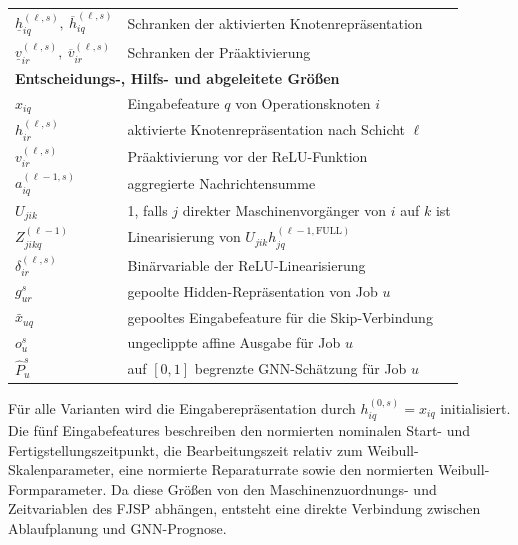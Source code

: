 \begin{table}[H]
\begin{tabularx}{\textwidth}{@{}lX@{}}
$\underline{h}_{iq}^{(\ell,s)},\ \overline{h}_{iq}^{(\ell,s)}$
& Schranken der aktivierten Knotenrepräsentation \\

$\underline{v}_{ir}^{(\ell,s)},\ \overline{v}_{ir}^{(\ell,s)}$
& Schranken der Präaktivierung \\

\midrule
\multicolumn{2}{l}{\textbf{Entscheidungs-, Hilfs- und abgeleitete Größen}}\\
\midrule

$x_{iq}$
& Eingabefeature $q$ von Operationsknoten $i$ \\

$h_{ir}^{(\ell,s)}$
& aktivierte Knotenrepräsentation nach Schicht $\ell$ \\

$v_{ir}^{(\ell,s)}$
& Präaktivierung vor der ReLU-Funktion \\

$a_{iq}^{(\ell-1,s)}$
& aggregierte Nachrichtensumme \\

$U_{jik}$
& 1, falls $j$ direkter Maschinenvorgänger von $i$ auf $k$ ist \\

$Z_{jikq}^{(\ell-1)}$
& Linearisierung von $U_{jik}h_{jq}^{(\ell-1,\mathrm{FULL})}$ \\

$\delta_{ir}^{(\ell,s)}$
& Binärvariable der ReLU-Linearisierung \\

$g_{ur}^{s}$
& gepoolte Hidden-Repräsentation von Job $u$ \\

$\bar{x}_{uq}$
& gepooltes Eingabefeature für die Skip-Verbindung \\

$o_u^s$
& ungeclippte affine Ausgabe für Job $u$ \\

$\widehat{P}_{u}^{s}$
& auf $[0,1]$ begrenzte GNN-Schätzung für Job $u$ \\

\bottomrule
\end{tabularx}
\end{table}

Für alle Varianten wird die Eingaberepräsentation durch
$h_{iq}^{(0,s)}=x_{iq}$ initialisiert. Die fünf Eingabefeatures beschreiben
den normierten nominalen Start- und Fertigstellungszeitpunkt, die
Bearbeitungszeit relativ zum Weibull-Skalenparameter, eine normierte
Reparaturrate sowie den normierten Weibull-Formparameter. Da diese Größen von
den Maschinenzuordnungs- und Zeitvariablen des FJSP abhängen, entsteht eine
direkte Verbindung zwischen Ablaufplanung und GNN-Prognose.


